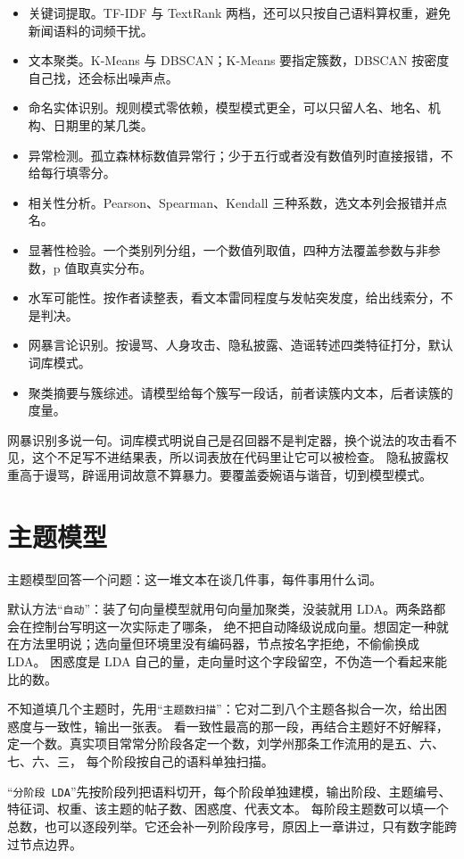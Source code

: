 \begin{itemize}
\item 关键词提取。TF-IDF 与 TextRank 两档，还可以只按自己语料算权重，避免新闻语料的词频干扰。
\item 文本聚类。K-Means 与 DBSCAN；K-Means 要指定簇数，DBSCAN 按密度自己找，还会标出噪声点。
\item 命名实体识别。规则模式零依赖，模型模式更全，可以只留人名、地名、机构、日期里的某几类。
\item 异常检测。孤立森林标数值异常行；少于五行或者没有数值列时直接报错，不给每行填零分。
\item 相关性分析。Pearson、Spearman、Kendall 三种系数，选文本列会报错并点名。
\item 显著性检验。一个类别列分组，一个数值列取值，四种方法覆盖参数与非参数，p 值取真实分布。
\item 水军可能性。按作者读整表，看文本雷同程度与发帖突发度，给出线索分，不是判决。
\item 网暴言论识别。按谩骂、人身攻击、隐私披露、造谣转述四类特征打分，默认词库模式。
\item 聚类摘要与簇综述。请模型给每个簇写一段话，前者读簇内文本，后者读簇的度量。
\end{itemize}

网暴识别多说一句。词库模式明说自己是召回器不是判定器，换个说法的攻击看不见，这个不足写不进结果表，所以词表放在代码里让它可以被检查。
隐私披露权重高于谩骂，辟谣用词故意不算暴力。要覆盖委婉语与谐音，切到模型模式。

\section{主题模型}

主题模型回答一个问题：这一堆文本在谈几件事，每件事用什么词。

默认方法“\texttt{自动}”：装了句向量模型就用句向量加聚类，没装就用 LDA。两条路都会在控制台写明这一次实际走了哪条，
绝不把自动降级说成向量。想固定一种就在方法里明说；选向量但环境里没有编码器，节点按名字拒绝，不偷偷换成 LDA。
困惑度是 LDA 自己的量，走向量时这个字段留空，不伪造一个看起来能比的数。

不知道填几个主题时，先用“\texttt{主题数扫描}”：它对二到八个主题各拟合一次，给出困惑度与一致性，输出一张表。
看一致性最高的那一段，再结合主题好不好解释，定一个数。真实项目常常分阶段各定一个数，刘学州那条工作流用的是五、六、七、六、三，
每个阶段按自己的语料单独扫描。

“\texttt{分阶段 LDA}”先按阶段列把语料切开，每个阶段单独建模，输出阶段、主题编号、特征词、权重、该主题的帖子数、困惑度、代表文本。
每阶段主题数可以填一个总数，也可以逐段列举。它还会补一列阶段序号，原因上一章讲过，只有数字能跨过节点边界。


